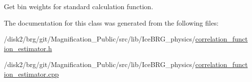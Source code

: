 Get bin weights for standard calculation function. 



The documentation for this class was generated from the following files\+:\begin{DoxyCompactItemize}
\item 
/disk2/brg/git/\+Magnification\+\_\+\+Public/src/lib/\+Ice\+B\+R\+G\+\_\+physics/\hyperlink{correlation__function__estimator_8h}{correlation\+\_\+function\+\_\+estimator.\+h}\item 
/disk2/brg/git/\+Magnification\+\_\+\+Public/src/lib/\+Ice\+B\+R\+G\+\_\+physics/\hyperlink{correlation__function__estimator_8cpp}{correlation\+\_\+function\+\_\+estimator.\+cpp}\end{DoxyCompactItemize}
